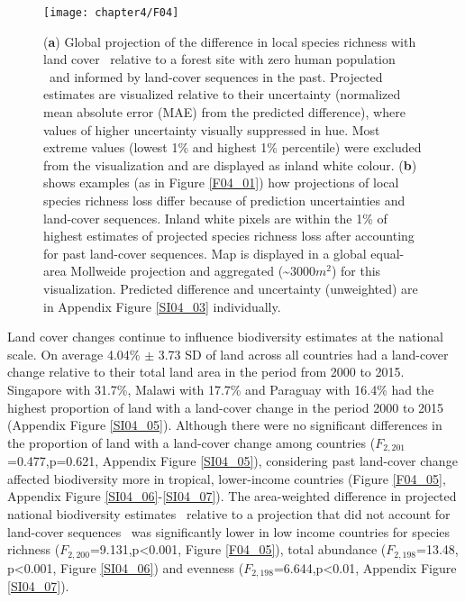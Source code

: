 \begin{figure}[ht]
\centering
\texttt{[image: chapter4/F04]}
\caption{ (\textbf{a}) Global projection of the difference in local species richness with land cover \textendash\ relative to a forest site with zero human population \textendash\ and informed by land-cover sequences in the past. Projected estimates are visualized relative to their uncertainty (normalized mean absolute error (MAE) from the predicted difference), where values of higher uncertainty visually suppressed in hue. Most extreme values (lowest 1\% and highest 1\% percentile) were excluded from the visualization and are displayed as inland white colour. (\textbf{b}) shows examples (as in Figure \ref{F04_01}) how projections of local species richness loss differ because of prediction uncertainties and land-cover sequences. Inland white pixels are within the 1\% of highest estimates of projected species richness loss after accounting for past land-cover sequences. Map is displayed in a global equal-area Mollweide projection and aggregated (\textasciitilde 3000$m^2$) for this visualization. Predicted difference and uncertainty (unweighted) are in Appendix Figure \ref{SI04_03} individually. }
\label{F04_04}
\end{figure}
Land cover changes continue to influence biodiversity estimates at the national scale. On average 4.04\% $\pm$ 3.73 SD of land across all countries had a land-cover change relative to their total land area in the period from 2000 to 2015. Singapore with 31.7\%, Malawi with 17.7\% and Paraguay with 16.4\% had the highest proportion of land with a land-cover change in the period 2000 to 2015 (Appendix Figure \ref{SI04_05}). Although there were no significant differences in the proportion of land with a land-cover change among countries ($F_{2,201}$=0.477,p=0.621, Appendix Figure \ref{SI04_05}), considering past land-cover change affected biodiversity more in tropical, lower-income countries (Figure \ref{F04_05}, Appendix Figure \ref{SI04_06}-\ref{SI04_07}). The area-weighted difference in projected national biodiversity estimates \textendash\ relative to a projection that did not account for land-cover sequences \textendash\ was significantly lower in low income countries for species richness ($F_{2,200}$=9.131,p<0.001, Figure \ref{F04_05}), total abundance ($F_{2,198}$=13.48, p<0.001, Figure \ref{SI04_06}) and evenness ($F_{2,198}$=6.644,p<0.01, Appendix Figure \ref{SI04_07}).

